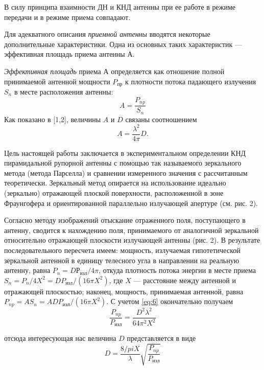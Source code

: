 В силу принципа взаимности ДН и КНД антенны при ее работе в режиме передачи и в режиме приема совпадают.

Для адекватного описания \textit{приемной антенны} вводятся некоторые дополнительные характеристики. 
Одна из основных таких характеристик — эффективная площадь приема антенны $А$.

\textit{Эффективная площадь} приема $А$ определяется как отношение полной принимаемой антенной мощности 
$P_{\text{пр}}$ к плотности потока падающего
излучения $S_n$ в месте расположения антенны:
\begin{equation}
    A = \frac{P_{np}}{S_n}
    \label{eq:5}
\end{equation}
Как показано в [1,2], величины $A$ и $D$ связаны соотношением
\begin{equation}
    A = \frac{\lambda^2}{4\pi}D.
    \label{eq:6}
\end{equation}

Цель настоящей работы заключается в экспериментальном определении КНД пирамидальной рупорной антенны с помощью так 
называемого зеркального метода (метода Парселла) и сравнении измеренного значения с рассчитанным теоретически. 
Зеркальный метод опирается на использование идеально (зеркально) отражающей плоской поверхности, расположенной в зоне 
Фраунгофера и ориентированной параллельно излучающей апертуре (см. рис. 2).

Согласно методу изображений отыскание отраженного поля, поступающего в антенну, сводится к нахождению поля, 
принимаемого от аналогичной зеркальной относительно отражающей плоскости излучающей антенны (рис. 2). В результате 
последовательного пересчета имеем: мощность, излучаемая гипотетической зеркальной антенной в единицу телесного угла 
в направлении на реальную антенну, равна $P_n = D Р_{\text{изл}}/4\pi$, откуда плотность потока энергии в месте приема 
$S_n = P_n/4X^2 = D P_{\text{изл}}/(16\pi X^2)$, где $X$ — расстояние между антенной и отражающей плоскостью; наконец, 
мощность, принимаемая антенной, равна $P_{np} =A S_n =A D P_{\text{изл}}/(16\pi X^2)$. С учетом \ref{eq:6} окончательно 
получаем
\begin{equation}
    \frac{P_{np}}{P_{\text{изл}}} = \frac{D^2\lambda^2}{64\pi^2X^2}
    \label{eq:7}
\end{equation}

отсюда интересующая нас величина $D$ представляется в виде 
\begin{equation}
    D = \frac{8/pi X}{\lambda}\sqrt{\frac{P_{np}}{P_{\text{изл}}}}
    \label{eq:8}
\end{equation}

